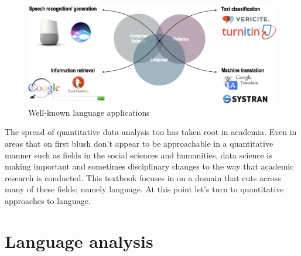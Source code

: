 \documentclass[
  letterpaper,
]{scrbook}
\begin{document}
\begin{figure}[h]

{\centering \includegraphics[width=4.5in,height=\textheight]{./figures/text-analysis/well-known-language-applications.png}

}

\caption{\label{fig-intro-language-applications}Well-known language
applications}

\end{figure}

The spread of quantitative data analysis too has taken root in academia.
Even in areas that on first blush don't appear to be approachable in a
quantitative manner such as fields in the social sciences and
humanities, data science is making important and sometimes disciplinary
changes to the way that academic research is conducted. This textbook
focuses in on a domain that cuts across many of these fields; namely
language. At this point let's turn to quantitative approaches to
language.

\hypertarget{language-analysis}{%
\section{Language analysis}\label{language-analysis}}
\end{document}
